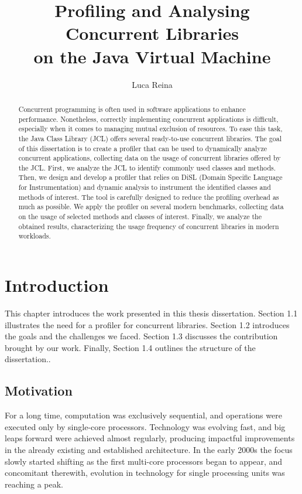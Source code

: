 \documentclass[]{usiinfthesis}
\title{Profiling and Analysing Concurrent Libraries\\ on the Java Virtual Machine}
\author{Luca Reina}
\begin{document}
\maketitle
\frontmatter
\begin{abstract}

\large
Concurrent programming is often used in software applications to enhance performance. Nonetheless, correctly implementing concurrent applications is difficult, especially when it comes to managing mutual exclusion of resources. To ease this task, the Java Class Library (JCL) offers several ready-to-use concurrent libraries. \newline The goal of this dissertation is to create a profiler that can be used to dynamically analyze concurrent applications, collecting data on the usage of concurrent libraries offered by the JCL. \newline First, we analyze the JCL to identify commonly used classes and methods. Then, we design and develop a profiler that relies on DiSL (Domain Specific Language for Instrumentation) and dynamic analysis to instrument the identified classes and methods of interest. The tool is carefully designed to reduce the profiling overhead as much as possible. We apply the profiler on several modern benchmarks, collecting data on the usage of selected methods and classes of interest. Finally, we analyze the obtained results, characterizing the usage frequency of concurrent libraries in modern workloads.
\end{abstract}
\begin{acknowledgements}
\end{acknowledgements}
\tableofcontents
\listoffigures
\listoftables
\mainmatter
\chapter{Introduction}
\large
This chapter introduces the work presented in this thesis dissertation. Section 1.1 illustrates the need for a profiler for concurrent libraries. Section 1.2 introduces the goals and the challenges we faced. Section 1.3 discusses the contribution brought by our work. Finally, Section 1.4 outlines the structure of the dissertation..

\section{Motivation}
For a long time, computation was exclusively sequential, and operations were executed only by single-core processors. Technology was evolving fast, and big leaps forward were achieved almost regularly, producing impactful improvements in the already existing and established architecture. In the early 2000s the focus slowly started shifting as the first multi-core processors began to appear, and concomitant therewith, evolution in technology for single processing units was reaching a peak. 
\end{document}
